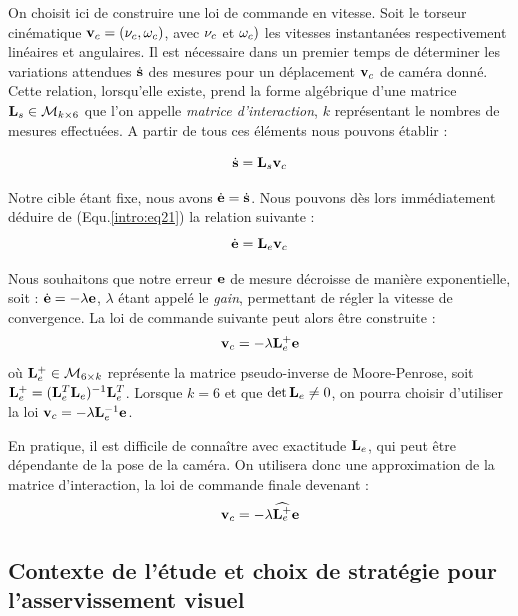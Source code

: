 On choisit ici de construire une loi de commande en vitesse. Soit le torseur cinématique ${\bf v}_c = ({\bf \nu}_c, {\bf \omega}_c)$, avec ${\bf \nu}_c$ et ${\bf \omega}_c)$ les vitesses instantanées respectivement linéaires et angulaires. Il est nécessaire dans un premier temps de déterminer les variations attendues $\dot {\bf s}$ des mesures pour un déplacement ${\bf v}_c$ de caméra donné. Cette relation, lorsqu'elle existe, prend la forme algébrique d'une matrice ${\bf L}_s \in \mathcal M_{k\times 6}$ que l'on appelle {\it matrice d'interaction}, $k$ représentant le nombres de mesures effectuées. A partir de tous ces éléments nous pouvons établir :

\begin{equation}
\dot {\bf s} = {\bf L}_s {\bf v}_c
\label{intro:eq21}
\end{equation}

Notre cible étant fixe, nous avons $\dot {\bf e} = \dot {\bf s}$. Nous pouvons dès lors immédiatement déduire de (Equ.\ref{intro:eq21}) la relation suivante :
\begin{equation}
\dot {\bf e} = {\bf L}_e {\bf v}_c
\label{intro:eq22}
\end{equation}

Nous souhaitons que notre erreur ${\bf e}$ de mesure décroisse de manière exponentielle, soit : $\dot {\bf e} = - \lambda {\bf e}$, $\lambda$ étant appelé le {\it gain}, permettant de régler la vitesse de convergence. La loi de commande suivante peut alors être construite :
\begin{equation}
{\bf v}_c = - \lambda {\bf L}_e^+ {\bf e} 
\label{intro:eq23}
\end{equation}
où ${\bf L}_e^+ \in \mathcal M_{6 \times k}$ représente la matrice pseudo-inverse de Moore-Penrose, soit ${\bf L}_e^+ = ({\bf L}_e^T {\bf L}_e)^{-1} {\bf L}_e^T$. Lorsque $k = 6$ et que $\det {\bf L}_e \neq 0$, on pourra choisir d'utiliser la loi ${\bf v}_c = - \lambda {\bf L}_e^{-1} {\bf e} $.

En pratique, il est difficile de connaître avec exactitude ${\bf L}_e$, qui peut être dépendante de la pose de la caméra. On utilisera donc une approximation de la matrice d'interaction, la loi de commande finale devenant :
\begin{equation}
{\bf v}_c = - \lambda \widehat {{\bf L}_e^+} {\bf e} 
\label{intro:eq23}
\end{equation}


\subsection{Contexte de l'étude et choix de stratégie pour l'asser\-vissement visuel}


